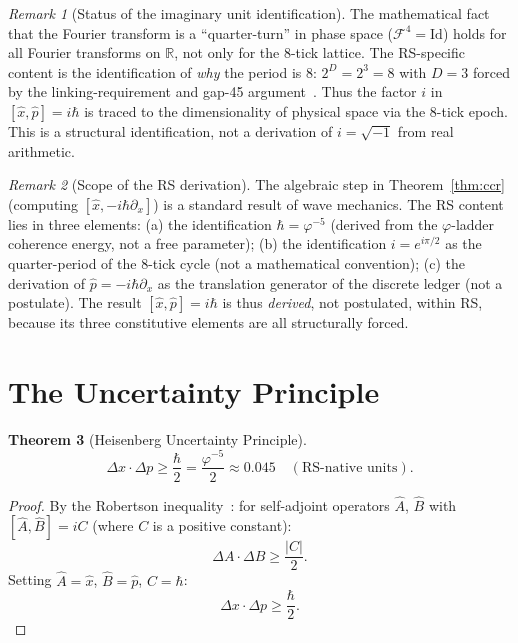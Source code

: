\documentclass[12pt,a4paper]{article}
\newtheorem{theorem}{Theorem}[section]
\theoremstyle{definition}
\theoremstyle{remark}
\newtheorem{remark}[theorem]{Remark}
\begin{document}
\begin{remark}[Status of the imaginary unit identification]
\label{rem:i-status}
The mathematical fact that the Fourier transform is a ``quarter-turn''
in phase space ($\mathcal{F}^4 = \mathrm{Id}$) holds for all
Fourier transforms on $\mathbb{R}$, not only for the 8-tick lattice.
The RS-specific content is the identification of \emph{why} the period
is $8$: $2^D = 2^3 = 8$ with $D = 3$ forced by the linking-requirement
and gap-45 argument~\cite{RS_Axioms}.  Thus the factor $i$ in
$[\hat{x}, \hat{p}] = i\hbar$ is traced to the dimensionality of
physical space via the 8-tick epoch.  This is a structural identification,
not a derivation of $i = \sqrt{-1}$ from real arithmetic.
\end{remark}

\begin{remark}[Scope of the RS derivation]
\label{rem:scope-ccr}
The algebraic step in Theorem~\ref{thm:ccr} (computing
$[\hat{x}, -i\hbar\partial_x]$) is a standard result of wave
mechanics.  The RS content lies in three elements:
(a) the identification $\hbar = \varphi^{-5}$ (derived from the
$\varphi$-ladder coherence energy, not a free parameter);
(b) the identification $i = e^{i\pi/2}$ as the quarter-period
of the 8-tick cycle (not a mathematical convention);
(c) the derivation of $\hat{p} = -i\hbar\partial_x$ as the
translation generator of the discrete ledger (not a postulate).
The result $[\hat{x}, \hat{p}] = i\hbar$ is thus \emph{derived},
not postulated, within RS, because its three constitutive elements
are all structurally forced.
\end{remark}

\section{The Uncertainty Principle}
\label{sec:uncertainty}

\begin{theorem}[Heisenberg Uncertainty Principle]
\label{thm:hup}
\begin{equation}
  \boxed{\Delta x \cdot \Delta p \geq \frac{\hbar}{2}
  = \frac{\varphi^{-5}}{2} \approx 0.045}
  \quad (\text{RS-native units}).
\end{equation}
\end{theorem}

\begin{proof}
By the Robertson inequality~\cite{Robertson1929}: for
self-adjoint operators $\hat{A}$, $\hat{B}$ with
$[\hat{A}, \hat{B}] = iC$ (where $C$ is a positive constant):
\begin{equation}
  \Delta A \cdot \Delta B \geq \frac{|C|}{2}.
\end{equation}
Setting $\hat{A} = \hat{x}$, $\hat{B} = \hat{p}$, $C = \hbar$:
\begin{equation}
  \Delta x \cdot \Delta p \geq \frac{\hbar}{2}.
\end{equation}
\end{proof}
\end{document}
